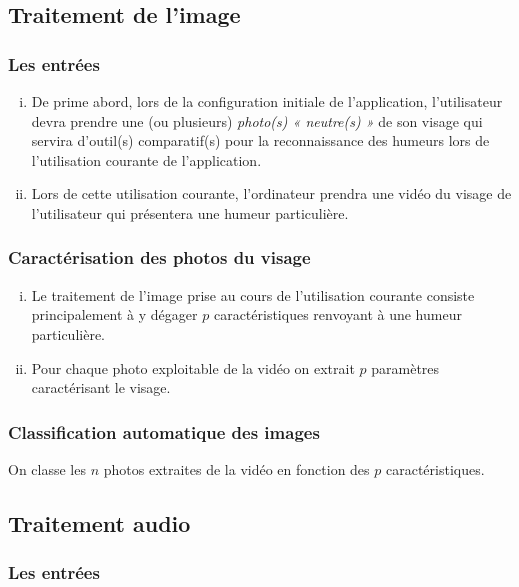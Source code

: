\subsection{Traitement de l’image}
\label{dB1}

	\subsubsection{Les entrées}
	\label{dB1.1}

		\begin{enumerate}[(i)]
		\item De prime abord, lors de la configuration initiale de l’application, l’utilisateur devra prendre une (ou plusieurs) \emph{photo(s) « neutre(s) »} de son visage qui servira d’outil(s) comparatif(s) pour la reconnaissance des humeurs lors de l’utilisation courante de l’application.
		\item Lors de cette utilisation courante, l’ordinateur prendra une vidéo du visage de l’utilisateur qui présentera une humeur particulière.
		\end{enumerate}

	\subsubsection{Caractérisation des photos du visage}
	\label{dB1.2}

		\begin{enumerate}[(i)]
		\item Le traitement de l’image prise au cours de l’utilisation courante consiste principalement à y dégager $p$ caractéristiques renvoyant à une humeur particulière.
		\item Pour chaque photo exploitable de la vidéo on extrait $p$ paramètres caractérisant le visage.
		\end{enumerate}

	\subsubsection{Classification automatique des images}
	\label{dB1.3}

		On classe les $n$ photos extraites de la vidéo en fonction des $p$ caractéristiques.

\subsection{Traitement audio}
\label{dB2}

	\subsubsection{Les entrées}
	\label{dB2.1}

